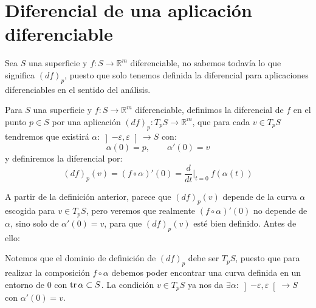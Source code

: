 \section{Diferencial de una aplicación diferenciable}
\noindent
Sea $S$ una superficie y $f:S\to \mathbb{R}^m$ diferenciable, no sabemos todavía lo que significa $(d f)_p$, puesto que solo tenemos definida la diferencial para aplicaciones diferenciables en el sentido del análisis.
\begin{definicion}
    Para $S$ una superficie y $f:S\to \mathbb{R}^m$ diferenciable, definimos la diferencial de $f$ en el punto $p\in S$ por una aplicación $(d f)_p:T_pS\to \mathbb{R}^m$, que para cada $v\in T_pS$ tendremos que existirá $\alpha:\left]-\varepsilon,\varepsilon\right[\to S$ con:
    \begin{equation*}
        \alpha(0) = p, \qquad \alpha'(0) = v
    \end{equation*}
    y definiremos la diferencial por:
    \begin{equation*}
        (d f)_p(v) = (f\circ \alpha)'(0) = \frac{d}{dt}\big|_{t=0}\ f(\alpha(t))
    \end{equation*}
\end{definicion}

\noindent
A partir de la definición anterior, parece que $(d f)_p(v)$ depende de la curva $\alpha$ escogida para $v\in T_pS$, pero veremos que realmente $(f\circ \alpha)'(0)$ no depende de $\alpha$, sino solo de $\alpha'(0) = v$, para que $(d f)_p(v)$ esté bien definido. Antes de ello:

\begin{observacion}
    Notemos que el dominio de definición de $(d f)_p$ debe ser $T_pS$, puesto que para realizar la composición $f\circ \alpha$ debemos poder encontrar una curva definida en un entorno de $0$ con $\operatorname{tr}\alpha\subset S$. La condición $v\in T_pS$ ya nos da $\exists \alpha:\left]-\varepsilon,\varepsilon\right[\to S$ con $\alpha'(0) = v$.
\end{observacion}~\\

